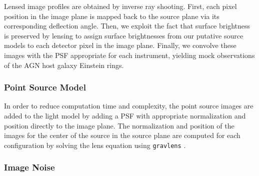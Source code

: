 \documentclass[a4paper,11pt]{article}
\begin{document}
Lensed image profiles are obtained by inverse ray shooting. First,
each pixel position in the image plane is mapped back to the source
plane via its corresponding deflection angle. Then, we exploit
the fact that surface brightness is preserved by lensing to assign
surface brightnesses from our putative source models to each detector pixel in the image plane.
Finally, we convolve these images with the PSF appropriate for each instrument, yielding
mock observations of the AGN host galaxy Einstein rings.


\subsubsection{Point Source Model}

In order to reduce computation time and complexity, the point source
images are added to the light model by adding a PSF with appropriate
normalization and position directly to the image plane. The
normalization and position of the images for the center of the source
in the source plane are computed for each configuration by solving the
lens equation using \texttt{gravlens} \cite{2011ascl.soft02003K}.


%


\subsubsection{Image Noise}
\end{document}
